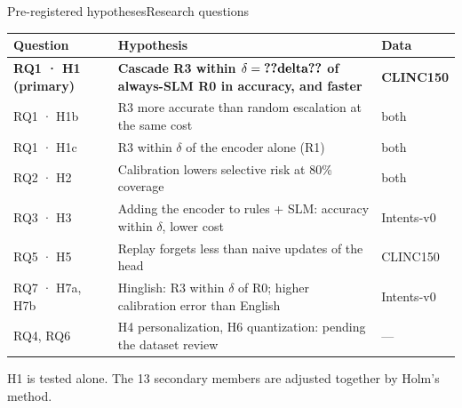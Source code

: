 \documentclass[aspectratio=169,11pt,xcolor=table]{beamer}
\makeatletter
\DeclareRobustCommand{\kv}[1]{\ifcsname kv@#1\endcsname\csname kv@#1\endcsname\else\textbf{??#1??}\fi}
\makeatother
\begin{document}
\begin{frame}{Pre-registered hypotheses}{Research questions}
  \vspace{1mm}
  {\footnotesize
  \begin{tabular}{@{}p{31mm}p{84mm}p{18mm}@{}}
    \toprule
    Question & Hypothesis & Data \\
    \midrule
    \rowcolor{highlight}\textbf{RQ1 · H1 (primary)} &
      \textbf{Cascade R3 within $\delta=\kv{delta}$ of always-SLM R0 in accuracy, and faster} & \textbf{CLINC150} \\
    RQ1 · H1b & R3 more accurate than random escalation at the same cost & both \\
    RQ1 · H1c & R3 within $\delta$ of the encoder alone (R1) & both \\
    RQ2 · H2 & Calibration lowers selective risk at 80\% coverage & both \\
    RQ3 · H3 & Adding the encoder to rules + SLM: accuracy within $\delta$, lower cost & Intents-v0 \\
    RQ5 · H5 & Replay forgets less than naive updates of the head & CLINC150 \\
    RQ7 · H7a, H7b & Hinglish: R3 within $\delta$ of R0; higher calibration error than English & Intents-v0 \\
    RQ4, RQ6 & H4 personalization, H6 quantization: pending the dataset review & --- \\
    \bottomrule
  \end{tabular}}
  \par\vspace{2.5mm}
  {\color{muted}\small H1 is tested alone. The 13 secondary members are adjusted together by Holm's method.\par}
\end{frame}
\end{document}

